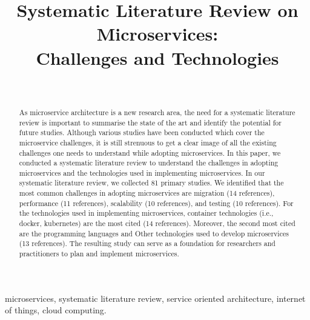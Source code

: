 \documentclass[comsoc,conference]{IEEEtran} %
\begin{document}
\title{Systematic Literature Review on Microservices: \\ Challenges and Technologies\\}
\author{ \\
}

\maketitle
\thispagestyle{plain}
\pagestyle{plain}

\begin{abstract}
As microservice architecture is a new research area, the need for a systematic literature review is important to summarise the state of the art and identify the potential for future studies. Although various studies have been conducted which cover the microservice challenges, it is still strenuous to get a clear image of all the existing challenges one needs to understand while adopting microservices. In this paper, we conducted a systematic literature review to understand the challenges in adopting microservices and the technologies used in implementing microservices.
In our systematic literature review, we collected 81 primary studies. We identified that the most common challenges in adopting microservices are migration (14 references), performance (11 references), scalability (10 references), and testing (10 references). For the technologies used in implementing microservices, container technologies (i.e., docker, kubernetes) are the most cited (14 references). Moreover, the second most cited are the programming languages and Other technologies used to develop microservices (13 references). The resulting study can serve as a foundation for researchers and practitioners to plan and implement microservices.

\end{abstract}

\begin{IEEEkeywords}
microservices, systematic literature review, service oriented architecture, internet of things, cloud computing. 
\end{IEEEkeywords}




















\end{document}
